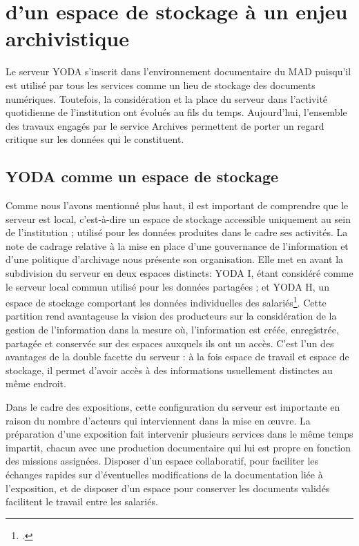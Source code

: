 \section{d’un espace de stockage à un enjeu archivistique}

Le serveur YODA s’inscrit dans l’environnement documentaire du MAD puisqu’il est utilisé par tous les services comme un lieu de stockage des documents numériques. Toutefois, la considération et la place du serveur dans l’activité quotidienne de l'institution ont évolués au fils du temps. Aujourd’hui, l’ensemble des travaux engagés par le service Archives permettent de porter un regard critique sur les données qui le constituent.

\subsection*{YODA comme un espace de stockage}

Comme nous l’avons mentionné plus haut, il est important de comprendre que le serveur est local, c’est-à-dire un espace de stockage accessible uniquement au sein de l’institution ; utilisé pour les données  produites dans le cadre ses activités. La note de cadrage relative à la mise en place d’une gouvernance de l’information et d’une politique d’archivage nous présente son organisation. Elle met en avant la subdivision du serveur en deux espaces distincts: YODA I, étant considéré comme le serveur local commun utilisé pour les  données partagées ; et YODA H, un espace de stockage comportant les données individuelles des salariés\footcite[version 4, p.~4]{bomel-dion-note-cadrage}. Cette partition rend avantageuse la vision des producteurs sur la considération de la gestion de l’information dans la mesure où, l’information est créée, enregistrée, partagée et conservée sur des espaces auxquels ils ont un accès. C’est l’un des avantages  de la double facette du serveur : à la fois espace de travail et espace de stockage, il permet d’avoir accès à des informations usuellement distinctes au même endroit.

Dans le cadre des expositions, cette configuration du serveur est importante en raison du nombre d’acteurs qui interviennent dans la mise en œuvre. La préparation d’une exposition fait intervenir plusieurs services dans le même temps impartit, chacun avec une production documentaire qui lui est propre en fonction des missions assignées. Disposer d’un espace collaboratif, pour faciliter les échanges rapides sur d’éventuelles modifications de la documentation liée à l’exposition, et de disposer d’un espace pour conserver les documents validés facilitent le travail entre les salariés.

